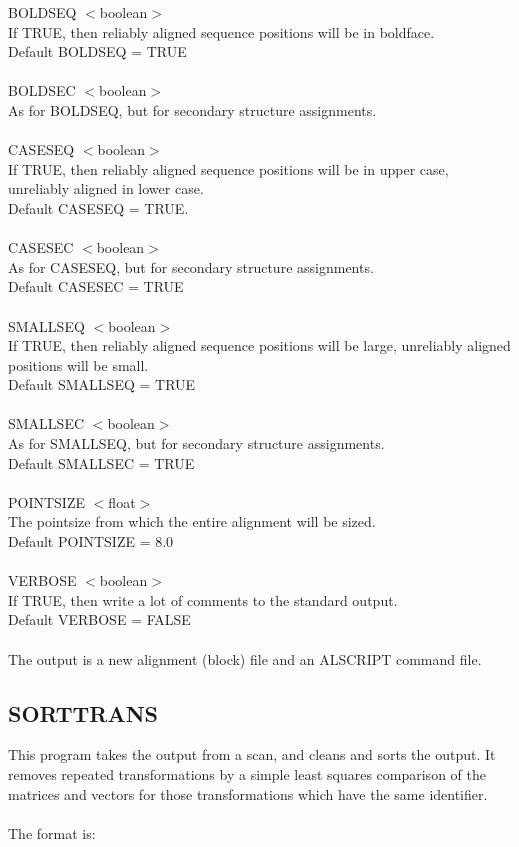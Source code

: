 BOLDSEQ $<$boolean$>$\\
If TRUE, then reliably aligned sequence positions will be in
boldface.\\
Default BOLDSEQ = TRUE\\
\\
BOLDSEC $<$boolean$>$\\
As for BOLDSEQ, but for secondary structure assignments.\\
\\
CASESEQ    $<$boolean$>$\\
If TRUE, then reliably aligned sequence positions will be in upper 
case, unreliably aligned in lower case.\\
Default CASESEQ = TRUE.\\
\\
CASESEC    $<$boolean$>$\\
As for CASESEQ, but for secondary structure assignments.\\
Default CASESEC = TRUE\\
\\
SMALLSEQ   $<$boolean$>$\\
If TRUE, then reliably aligned sequence positions will be large, 
unreliably aligned positions will be small.\\
Default SMALLSEQ = TRUE\\
\\
SMALLSEC   $<$boolean$>$\\
As for SMALLSEQ, but for secondary structure assignments.\\
Default SMALLSEC = TRUE\\
\\
POINTSIZE  $<$float$>$\\
The pointsize from which the entire alignment will be sized.\\
Default POINTSIZE = 8.0\\
\\
VERBOSE    $<$boolean$>$\\
If TRUE, then write a lot of comments to the standard output.\\
Default VERBOSE = FALSE\\
\\
The output is a new alignment (block) file and an ALSCRIPT command file.

\subsection{SORTTRANS}

This program takes the output from a scan, and cleans and sorts the
output.  It removes repeated transformations by a simple least 
squares comparison of the matrices and vectors for those 
transformations which have the same identifier.\\
\\
The format is:\\

